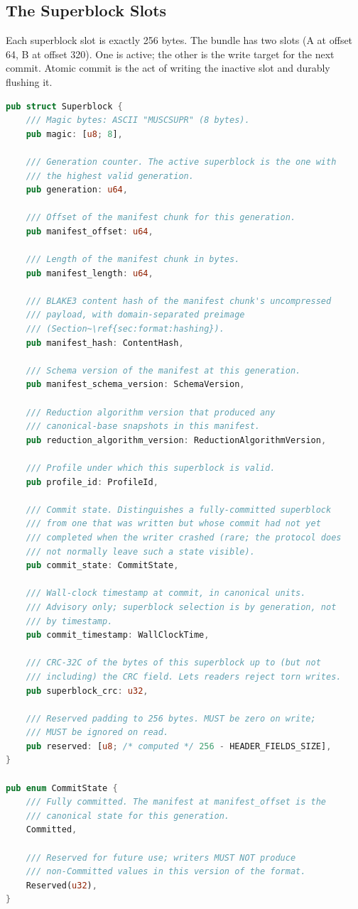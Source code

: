 \documentclass[11pt,letterpaper]{report}
\begin{document}
\subsection{The Superblock Slots}

Each superblock slot is exactly 256 bytes. The bundle has two slots
(A at offset 64, B at offset 320). One is active; the other is the
write target for the next commit. Atomic commit is the act of
writing the inactive slot and durably flushing it.

\begin{lstlisting}[language=Rust]
pub struct Superblock {
    /// Magic bytes: ASCII "MUSCSUPR" (8 bytes).
    pub magic: [u8; 8],

    /// Generation counter. The active superblock is the one with
    /// the highest valid generation.
    pub generation: u64,

    /// Offset of the manifest chunk for this generation.
    pub manifest_offset: u64,

    /// Length of the manifest chunk in bytes.
    pub manifest_length: u64,

    /// BLAKE3 content hash of the manifest chunk's uncompressed
    /// payload, with domain-separated preimage
    /// (Section~\ref{sec:format:hashing}).
    pub manifest_hash: ContentHash,

    /// Schema version of the manifest at this generation.
    pub manifest_schema_version: SchemaVersion,

    /// Reduction algorithm version that produced any
    /// canonical-base snapshots in this manifest.
    pub reduction_algorithm_version: ReductionAlgorithmVersion,

    /// Profile under which this superblock is valid.
    pub profile_id: ProfileId,

    /// Commit state. Distinguishes a fully-committed superblock
    /// from one that was written but whose commit had not yet
    /// completed when the writer crashed (rare; the protocol does
    /// not normally leave such a state visible).
    pub commit_state: CommitState,

    /// Wall-clock timestamp at commit, in canonical units.
    /// Advisory only; superblock selection is by generation, not
    /// by timestamp.
    pub commit_timestamp: WallClockTime,

    /// CRC-32C of the bytes of this superblock up to (but not
    /// including) the CRC field. Lets readers reject torn writes.
    pub superblock_crc: u32,

    /// Reserved padding to 256 bytes. MUST be zero on write;
    /// MUST be ignored on read.
    pub reserved: [u8; /* computed */ 256 - HEADER_FIELDS_SIZE],
}

pub enum CommitState {
    /// Fully committed. The manifest at manifest_offset is the
    /// canonical state for this generation.
    Committed,

    /// Reserved for future use; writers MUST NOT produce
    /// non-Committed values in this version of the format.
    Reserved(u32),
}
\end{lstlisting}
\end{document}
